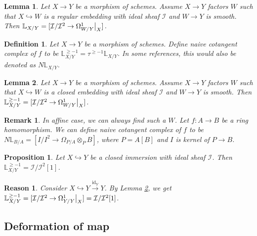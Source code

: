 \documentclass{ctexart}
\newtheorem{definition}{Definition}[section]
\newtheorem{remark}{Remark}[section]
\newtheorem{proposition}{Proposition}[section]
\newtheorem{lemma}{Lemma}[section]
\newtheorem{reason}{Reason}[section]
\newcommand{\identity}{\operatorname{id}}
\begin{document}
\begin{lemma}
    Let $X \rightarrow Y$ be a morphism of schemes.
    Assume $X \rightarrow Y$ factors $W$ such that $X \hookrightarrow W$ is a regular embedding with ideal sheaf $\mathcal{I}$ and $W \rightarrow Y$ is smooth.
    Then $\mathbb{L}_{X/Y} = [\mathcal{I}/\mathcal{I}^2 \rightarrow \Omega_{W/Y}^{1}\big{|}_{X}]$.
    \label{Lemma 7.3}
\end{lemma}
\begin{definition}
    Let $X \rightarrow Y$ be a morphism of schemes.
    Define naive cotangent complex of $f$ to be $\mathbb{L}_{X/Y}^{\ge -1} = \tau^{\ge -1}\mathbb{L}_{X/Y}$.
    In some references, this would also be denoted as $N\mathbb{L}_{X/Y}$.
\end{definition}
\begin{lemma}
    Let $X \rightarrow Y$ be a morphism of schemes.
    Assume $X \rightarrow Y$ factors $W$ such that $X \hookrightarrow W$ is a closed embedding with ideal sheaf $\mathcal{I}$ and $W \rightarrow Y$ is smooth.
    Then $\mathbb{L}_{X/Y}^{\ge -1} = [\mathcal{I}/\mathcal{I}^2 \rightarrow \Omega_{W/Y}^{1}\big{|}_{X}]$.
    \label{Lemma 7.4}
\end{lemma}
\begin{remark}
    In affine case, we can always find such a $W$.
    Let $f: A \rightarrow B$ be a ring homomorphism.
    We can define naive cotangent complex of $f$ to be $N\mathbb{L}_{B/A} = [I/I^{2} \rightarrow \Omega_{P/A} \otimes_{P} B]$,
    where $P = A[B]$ and $I$ is kernel of $P \rightarrow B$.
\end{remark}
\begin{proposition}
    Let $X \hookrightarrow Y$ be a closed immersion with ideal sheaf $\mathcal{I}$.
    Then $\mathbb{L}_{X/Y}^{\ge -1} = \mathcal{I}/\mathcal{I}^{2}[1]$.
    \label{Proposition 7.2}
\end{proposition}
\begin{reason}
    Consider $X \hookrightarrow Y \overset{\identity_{Y}}{\rightarrow} Y$.
    By Lemma \ref{Lemma 7.4}, we get $\mathbb{L}_{X/Y}^{\ge -1} = [\mathcal{I}/\mathcal{I}^2 \rightarrow \Omega_{Y/Y}^{1}\big{|}_{X}] = \mathcal{I}/\mathcal{I}^{2}[1]$.
\end{reason}

\subsection{Deformation of map}
\label{subsection:Cotangent_Complex_Deformation_of_map}
\end{document}
